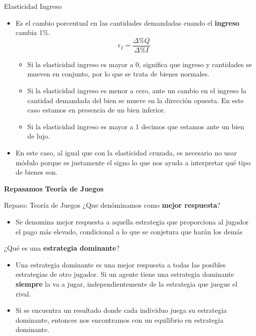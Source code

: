 \documentclass{beamer}
\begin{document}
\begin{frame}{Elasticidad Ingreso}
  \begin{itemize}
    \item Es el cambio porcentual en las cantidades demandadas cuando el \textbf{ingreso} cambia 1\%.
    \begin{equation*}
      \epsilon_I = \frac{\Delta \% Q}{\Delta \% I}
    \end{equation*}    
    \begin{itemize}
        \item Si la elasticidad ingreso es mayor a 0, significa que ingreso y cantidades se mueven en conjunto, por lo que se trata de bienes normales.
        \item Si la elasticidad ingreso es menor a cero, ante un cambio en el ingreso la cantidad demandada del bien se mueve en la dirección opuesta. En este caso estamos en presencia de un bien inferior.
        \item Si la elasticidad ingreso es mayor a 1 decimos que estamos ante un bien de lujo.
    \end{itemize}
    \item  En este caso, al igual que con la elasticidad cruzada, es necesario no usar módulo porque es justamente el signo lo que nos ayuda a interpretar qué tipo de bienes son.
\end{itemize}
\end{frame}

\begin{frame}
    \centering
    \begin{boxB}
    \centering \Large \textbf{Repasamos Teoría de Juegos} \\   
    \end{boxB}
\end{frame}

\begin{frame}{Repaso: Teoría de Juegos}
    ¿Que denóminamos como \textbf{mejor respuesta}? \pause
    \begin{itemize}
        \item  Se denomina mejor respuesta a aquella estrategia que proporciona al jugador el pago más elevado, condicional a lo que se conjetura que harán los demás
    \end{itemize} \pause
    \vspace{2mm}
    ¿Qué es una \textbf{estrategia dominante}? \pause
    \begin{itemize}
        \item Una estrategia dominante es una mejor respuesta a todas las posibles estrategias de otro jugador. Si un agente tiene una estrategia dominante \textbf{siempre} la va a jugar, independientemente de la estrategia que juegue el rival.
        \item Si se encuentra un resultado donde cada individuo juega su estrategia dominante, entonces nos encontramos con un equilibrio en estrategia dominante.
        \end{itemize}
\end{frame}
\end{document}
